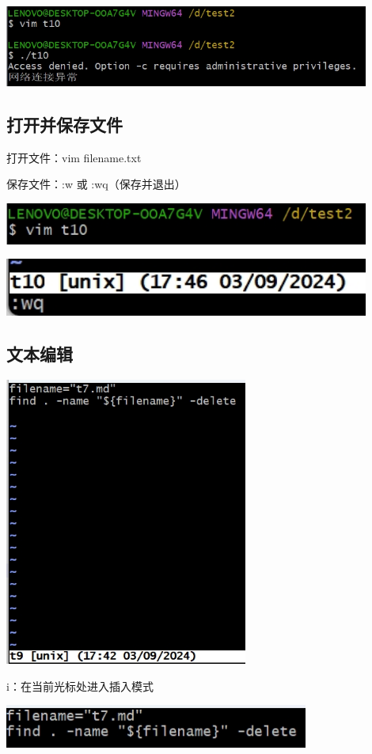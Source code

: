 \documentclass[UTF8,a4paper]{ctexart}
\begin{document}
\begin{sloppypar}
	\includegraphics[width = 12cm]{42}
	
	\subsection{打开并保存文件}
	打开文件：vim filename.txt
	
	保存文件：:w 或 :wq（保存并退出）
	
	\includegraphics[width = 12cm]{43}
	
	\includegraphics[width = 12cm]{44}
	
	\subsection{文本编辑}
	
	\includegraphics[width = 8cm]{45}
	
	i：在当前光标处进入插入模式
	
	\includegraphics[width = 10cm]{46}
	

\end{sloppypar}
\end{document}
